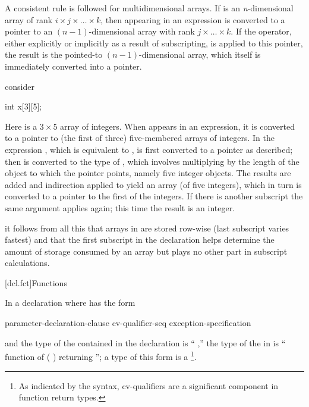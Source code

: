 \pnum
A consistent rule is followed for
%
multidimensional arrays.
If
is an
\textit{n}-dimensional
array
of rank
$i \times j \times \ldots \times k$,
then
appearing in an expression
is converted to
a pointer to an $(n-1)$-dimensional
array with rank
$j \times \ldots \times k$.
If the
\tcode{*}
operator, either explicitly
or implicitly as a result of subscripting,
is applied to this pointer,
the result is the pointed-to $(n-1)$-dimensional array,
which itself is immediately converted into a pointer.

\pnum
\enterexample
consider

\begin{codeblock}
int x[3][5];
\end{codeblock}

Here
is a $3 \times 5$ array of integers.
When
appears in an expression, it is converted
to a pointer to (the first of three) five-membered arrays of integers.
In the expression
,
which is equivalent to
,
is first converted to a pointer as described;
then
is converted to the type of
,
which involves multiplying
by the
length of the object to which the pointer points,
namely five integer objects.
The results are added and indirection applied to
yield an array (of five integers), which in turn is converted to
a pointer to the first of the integers.
If there is another subscript the same argument applies
again; this time the result is an integer.
\exitexample

\pnum
\enternote
it follows from all this that arrays in \Cpp are stored
row-wise (last subscript varies fastest)
%
and that the first subscript in the declaration helps determine
the amount of storage consumed by an array
but plays no other part in subscript calculations.
\exitnote

[dcl.fct]{Functions}%

\pnum
{}%
In a declaration
where
has the form

\begin{ncsimplebnf}
 parameter-declaration-clause \terminal{)} cv-qualifier-seq\opt
exception-specification\opt
\end{ncsimplebnf}

and the type of the contained
in the declaration
is
``
,''
the type of the
in
is `` function of
( )
 returning
'';
a type of this form is a \footnote{As indicated by the
syntax, cv-qualifiers are a significant component in function return types.}.

